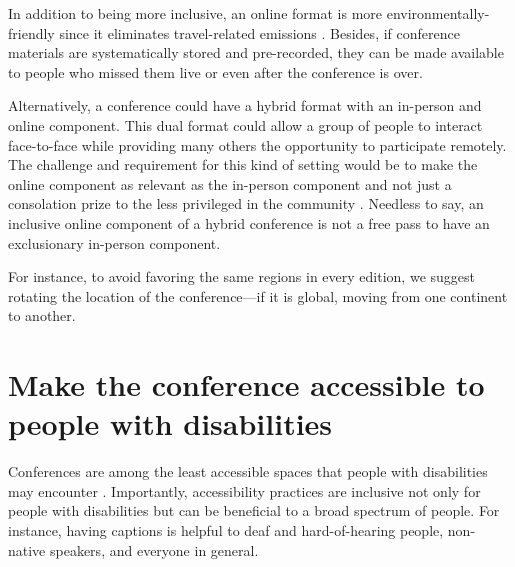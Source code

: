 \documentclass[10pt,letterpaper]{article}
\begin{document}
In addition to being more inclusive, an online format is more environmentally-friendly since it eliminates travel-related emissions \cite{sarabipourChangingScientificMeetings2021,ninerBetterWhomLeveling2021, gattrellComparisonCarbonCosts2021}. 
Besides, if conference materials are systematically stored and pre-recorded, they can be made available to people who missed them live or even after the conference is over. 

Alternatively, a conference could have a hybrid format with an in-person and online component. This dual format could allow a group of people to interact face-to-face while providing many others the opportunity to participate remotely. The challenge and requirement for this kind of setting would be to make the online component as relevant as the in-person component and not just a consolation prize to the less privileged in the community \cite{ninerBetterWhomLeveling2021}.
Needless to say, an inclusive online component of a hybrid conference is not a free pass to have an exclusionary in-person component. %

For instance, to avoid favoring the same regions in every edition, we suggest rotating the location of the conference—if it is global, moving from one continent to another. 


\section{Make the conference accessible to people with disabilities}
\label{rule_accessibility}


Conferences are among the least accessible spaces that people with disabilities may encounter \cite{priceAccessImaginedConstruction2009}.
Importantly, accessibility practices are inclusive not only for people with disabilities but can be beneficial to a broad spectrum of people. For instance, having captions is helpful to deaf and hard-of-hearing people, non-native speakers, and everyone in general. 
\end{document}
